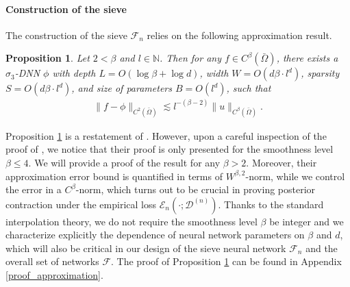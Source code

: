 \documentclass{article}
\newcommand{\F}{\mathcal{F}}
\newcommand{\D}{\mathcal{D}}
\theoremstyle{plain}
\newtheorem{proposition}[theorem]{Proposition}
\theoremstyle{definition}
\theoremstyle{remark}
\begin{document}
\paragraph{Construction of the sieve}
The construction of the sieve $\F_n$ relies on the following approximation result.
\begin{proposition}\label{approximation}
Let $2 < \beta$ and $l \in \mathbb{N}$. Then for any $f \in C^{\beta}(\bar{\Omega})$, there exists  a $\sigma_3$-DNN $\phi$ with depth $L = O(\log \beta + \log d )$, width $W = O(d \beta \cdot l^d)$, sparsity $S = O(d \beta \cdot l^d)$, and size of parameters $B = O( l^d)$, such that 
 \begin{align*} 
     \|f - \phi\|_{C^{2}(\bar{\Omega})} \lesssim l^{-(\beta - 2)} \|u\|_{C^{\beta}(\bar{\Omega})}. 
 \end{align*}
\end{proposition}
Proposition \ref{approximation} is a restatement of \citep[Theorem 4.5]{lu2021machine}. However, upon a careful inspection of the proof of \citep[Theorem 4.5]{lu2021machine}, we notice that their proof is only presented for the smoothness level $\beta\leq 4$. We will provide a proof of the result for any $\beta> 2$. Moreover, their approximation error bound is quantified in terms of $W^{\beta,2}$-norm, while we control the error in a $C^{\beta}$-norm, which turns out to be crucial in proving posterior contraction under the empirical loss $\mathcal{E}_n(\cdot; \D^{(n)})$.
Thanks to the standard interpolation theory, we do not require the smoothness level $\beta$ be integer and we characterize explicitly  the dependence of neural network parameters on $\beta$ and $d$, which  will also be critical   in our design of the sieve neural network $\F_n$ and the overall set of networks $\F$. The proof of Proposition \ref{approximation} can be found in Appendix \ref{proof_approximation}. 

\end{document}
